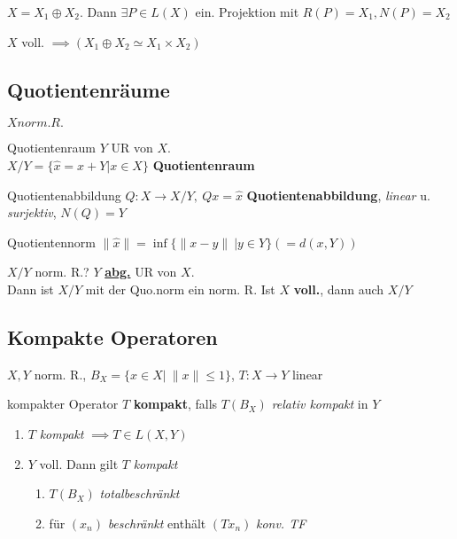 \begin{lemma}
  $X = X_1 \oplus X_2$. Dann $\exists P \in L(X)$ ein. Projektion mit
  $R(P) = X_1, N(P) = X_2$
\end{lemma}

\begin{bemerkung}
  $X$ voll. $\implies (X_1 \oplus X_2 \simeq X_1 \times X_2)$
\end{bemerkung}


\subsection{Quotientenräume}
$X norm. R.$

\begin{definition}{Quotientenraum}
  $Y$ UR von $X$.\\
  $X/Y = \{\hat{x} = x + Y| x\in X\}$ \textbf{Quotientenraum}
\end{definition}

\begin{definition}{Quotientenabbildung}
  $Q:X \to X/Y,\ Qx = \hat{x}$ \textbf{Quotientenabbildung},
  \textit{linear} u. \textit{surjektiv}, $N(Q) = Y$
\end{definition}

\begin{definition}{Quotientennorm}
  $\|\hat{x}\| = \inf\{\|x-y\|\ |y\in Y \} (= d(x,Y))$
\end{definition}

\begin{satz}{$X/Y$ norm. R.?}
  $Y$ \textbf{\uline{abg.}} UR von $X$.\\
  Dann ist $X/Y$ mit der Quo.norm ein norm. R. Ist $X$ \textbf{voll.}, dann
  auch $X/Y$
\end{satz}


\subsection{Kompakte Operatoren}

$X,Y$ norm. R., $B_X=\{x \in X|\ \|x\| \leq 1\}$, $T:X \to Y$ linear

\begin{definition}{kompakter Operator}
  $T$ \textbf{kompakt}, falls $T(B_X)$ \textit{relativ kompakt} in $Y$
\end{definition}

\begin{bemerkung}
  \begin{enumerate}[label = (\roman*)]
    \item $T$ \textit{kompakt} $\implies T \in L(X,Y)$
    \item $Y$ voll. Dann gilt $T$ \textit{kompakt}
      \begin{enumerate}[label = $\Leftrightarrow$]
        \item $T(B_X)$ \textit{totalbeschränkt}
        \item für $(x_n)$ \textit{beschränkt} enthält
          $(Tx_n)$ \textit{konv. TF}
      \end{enumerate}
  \end{enumerate}
\end{bemerkung}

